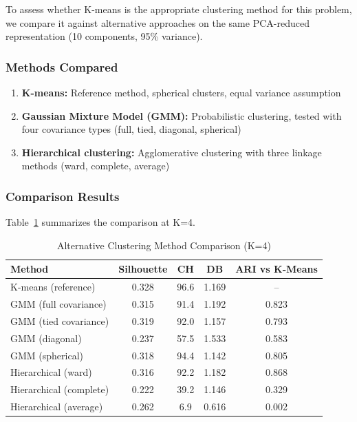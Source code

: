 \documentclass[11pt,a4paper]{article}
\begin{document}
To assess whether K-means is the appropriate clustering method for this problem, we compare it against alternative approaches on the same PCA-reduced representation (10 components, 95\% variance).

\subsubsection{Methods Compared}

\begin{enumerate}
    \item \textbf{K-means:} Reference method, spherical clusters, equal variance assumption
    \item \textbf{Gaussian Mixture Model (GMM):} Probabilistic clustering, tested with four covariance types (full, tied, diagonal, spherical)
    \item \textbf{Hierarchical clustering:} Agglomerative clustering with three linkage methods (ward, complete, average)
\end{enumerate}

\subsubsection{Comparison Results}

Table~\ref{tab:alternative_clustering} summarizes the comparison at K=4.

\begin{table}[ht]
\centering
\small
\caption{Alternative Clustering Method Comparison (K=4)}
\label{tab:alternative_clustering}
\begin{tabular}{@{}p{4.2cm}cccc@{}}
\toprule
Method & Silhouette & CH & DB & ARI vs K-Means \\
\midrule
K-means (reference) & 0.328 & 96.6 & 1.169 & -- \\
GMM (full covariance) & 0.315 & 91.4 & 1.192 & 0.823 \\
GMM (tied covariance) & 0.319 & 92.0 & 1.157 & 0.793 \\
GMM (diagonal) & 0.237 & 57.5 & 1.533 & 0.583 \\
GMM (spherical) & 0.318 & 94.4 & 1.142 & 0.805 \\
Hierarchical (ward) & 0.316 & 92.2 & 1.182 & 0.868 \\
Hierarchical (complete) & 0.222 & 39.2 & 1.146 & 0.329 \\
Hierarchical (average) & 0.262 & 6.9 & 0.616 & 0.002 \\
\bottomrule
\end{tabular}
\end{table}
\end{document}
